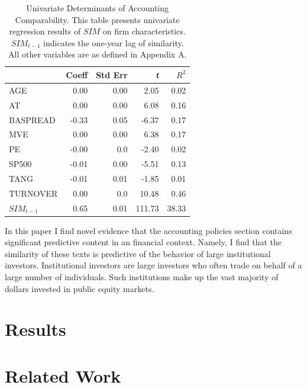 \documentclass{article}
\begin{document}
\begin{table}[t]													
 \caption{Univariate Determinants of Accounting Comparability. This table presents univariate regression results of $SIM$ on firm characteristics. $SIM_{t-1}$ indicates the one-year lag of similarity. All other variables are as defined in Appendix A.}
 \label{cossim-uni}																				
\vskip 0.15in
\begin{center}
\begin{small}
\begin{sc}
\begin{tabular}{lrrrr}
  \hline
\abovespace\belowspace
 & Coeff & Std Err & \emph{t} & $R^2$\\ 
  \hline
\abovespace
AGE & 0.00 & 0.00 & 2.05 & 0.02 \\ 
AT & 0.00 & 0.00 & 6.08& 0.16 \\ 
BASPREAD & -0.33 & 0.05& -6.37 & 0.17 \\ 
MVE & 0.00 & 0.00 & 6.38 & 0.17 \\ 
PE & -0.00 & 0.0 & -2.40 & 0.02 \\ 
SP500 & -0.01 & 0.00 & -5.51 & 0.13 \\ 
TANG & -0.01 & 0.01 & -1.85 & 0.01 \\ 
TURNOVER & 0.00 & 0.0 & 10.48 & 0.46 \\ 
$SIM_{t-1}$ & 0.65 & 0.01 & 111.73 & 38.33 \\
   \hline
\end{tabular}
\end{sc}
\end{small}
\end{center}
\vskip -0.1in
\end{table}

In this paper I find novel evidence that the accounting policies section contains significant predictive content in an financial context. Namely, I find that the similarity of these texts is predictive of the behavior of large institutional investors. Institutional investors are large investors who often trade on behalf of a large number of individuals. Such institutions make up the vast majority of dollars invested in public equity markets.

\section{Results}\label{results}
\section{Related Work}\label{lit}
\end{document}
